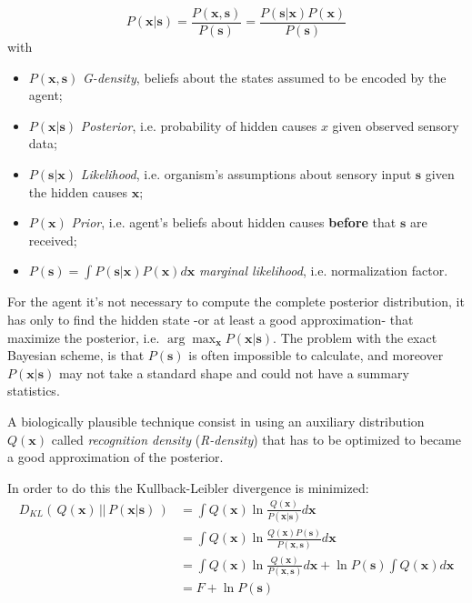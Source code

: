 \documentclass[a4paper, 10pt]{article}
\begin{document}
\begin{equation}
P(\mathbf{x}|\mathbf{s}) = \frac{P(\mathbf{x},\mathbf{s})}{P(\mathbf{s})} = \frac{P(\mathbf{s}|\mathbf{x})P(\mathbf{x})}{P(\mathbf{s})}
\end{equation}
with
\begin{itemize}

\item $P(\mathbf{x},\mathbf{s})$ \emph{G-density}, beliefs about the states assumed to be encoded by the agent;

\item $P(\mathbf{x}|\mathbf{s})$ \emph{Posterior}, i.e. probability of hidden causes $x$ given observed sensory data; 

\item $P(\mathbf{s}|\mathbf{x})$ \emph{Likelihood}, i.e. organism's assumptions about sensory input $\mathbf{s}$ given the hidden causes $\mathbf{x}$;

\item $P(\mathbf x)$ \emph{Prior}, i.e. agent's beliefs about hidden causes \textbf{before} that $\mathbf s$ are received;

\item $P(\mathbf s)=\int P(\mathbf s|\mathbf x)P(\mathbf x) d\mathbf x $ \emph{marginal likelihood}, i.e. normalization factor.

\end{itemize}

For the agent it's not necessary to compute the complete posterior distribution, it has only to find the hidden state -or at least a good approximation- that maximize the posterior, i.e. $\arg \max_{\mathbf{x}} P(\mathbf x|\mathbf s)$.
The problem with the exact Bayesian scheme, is that $P(\mathbf s)$ is often impossible to calculate, and moreover $P(\mathbf x|\mathbf s)$ may not take a standard shape and could not have a summary statistics. 

A biologically plausible technique consist in using an auxiliary distribution $Q(\mathbf x)$ called \emph{recognition density} (\emph{R-density}) that has to be optimized to became a good approximation of the posterior.  

In order to do this the Kullback-Leibler  divergence is minimized:
\begin{equation}
\begin{split}
D_{KL} (\, Q(\mathbf x)\, ||\, P(\mathbf x|\mathbf s)\, ) & = \int Q(\mathbf x) \ln \frac{Q(\mathbf x)}{P(\mathbf x|\mathbf s)} d\mathbf x \\
                                  & = \int Q(\mathbf x) \ln \frac{Q(\mathbf x)P(\mathbf s)}{P(\mathbf x,\mathbf s)} d\mathbf x \\
                                  & = \int Q(\mathbf x) \ln \frac{Q(\mathbf x)}{P(\mathbf x,\mathbf s)} d\mathbf x + \ln P(\mathbf s) \int Q(\mathbf x) d\mathbf x \\
                                  & = F + \ln P(\mathbf s)
\end{split}
\end{equation}
\end{document}
